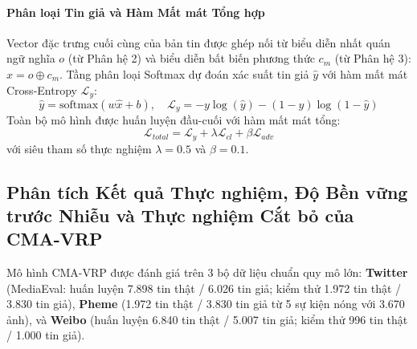 \documentclass[conference,10pt]{IEEEtran}
\begin{document}
\paragraph{Phân loại Tin giả và Hàm Mất mát Tổng hợp}
Vector đặc trưng cuối cùng của bản tin được ghép nối từ biểu diễn nhất quán ngữ nghĩa $o$ (từ Phân hệ 2) và biểu diễn bất biến phương thức $c_m$ (từ Phân hệ 3): $\hat{x} = o \oplus c_m$. Tầng phân loại Softmax dự đoán xác suất tin giả $\hat{y}$ với hàm mất mát Cross-Entropy $\mathcal{L}_y$:
\begin{equation}
    \hat{y} = \text{softmax}(w \hat{x} + b), \quad \mathcal{L}_y = -y \log(\hat{y}) - (1 - y) \log(1 - \hat{y})
    \label{eq:cmavrp_cls}
\end{equation}
Toàn bộ mô hình được huấn luyện đầu-cuối với hàm mất mát tổng:
\begin{equation}
    \mathcal{L}_{total} = \mathcal{L}_y + \lambda \mathcal{L}_{cl} + \beta \mathcal{L}_{adv}
    \label{eq:cmavrp_total}
\end{equation}
với siêu tham số thực nghiệm $\lambda = 0.5$ và $\beta = 0.1$.

\subsection{Phân tích Kết quả Thực nghiệm, Độ Bền vững trước Nhiễu và Thực nghiệm Cắt bỏ của CMA-VRP}

Mô hình CMA-VRP được đánh giá trên 3 bộ dữ liệu chuẩn quy mô lớn: \textbf{Twitter} (MediaEval: huấn luyện 7.898 tin thật / 6.026 tin giả; kiểm thử 1.972 tin thật / 3.830 tin giả), \textbf{Pheme} (1.972 tin thật / 3.830 tin giả từ 5 sự kiện nóng với 3.670 ảnh), và \textbf{Weibo} (huấn luyện 6.840 tin thật / 5.007 tin giả; kiểm thử 996 tin thật / 1.000 tin giả).
\end{document}
